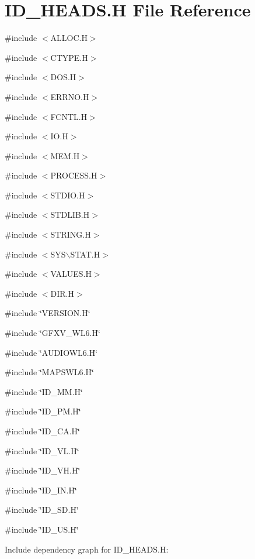 \hypertarget{ID__HEADS_8H}{
\section{ID\_\-HEADS.H File Reference}
\label{ID__HEADS_8H}
}
{\ttfamily \#include $<$ALLOC.H$>$}\par
{\ttfamily \#include $<$CTYPE.H$>$}\par
{\ttfamily \#include $<$DOS.H$>$}\par
{\ttfamily \#include $<$ERRNO.H$>$}\par
{\ttfamily \#include $<$FCNTL.H$>$}\par
{\ttfamily \#include $<$IO.H$>$}\par
{\ttfamily \#include $<$MEM.H$>$}\par
{\ttfamily \#include $<$PROCESS.H$>$}\par
{\ttfamily \#include $<$STDIO.H$>$}\par
{\ttfamily \#include $<$STDLIB.H$>$}\par
{\ttfamily \#include $<$STRING.H$>$}\par
{\ttfamily \#include $<$SYS$\backslash$STAT.H$>$}\par
{\ttfamily \#include $<$VALUES.H$>$}\par
{\ttfamily \#include $<$DIR.H$>$}\par
{\ttfamily \#include \char`\"{}VERSION.H\char`\"{}}\par
{\ttfamily \#include \char`\"{}GFXV\_\-WL6.H\char`\"{}}\par
{\ttfamily \#include \char`\"{}AUDIOWL6.H\char`\"{}}\par
{\ttfamily \#include \char`\"{}MAPSWL6.H\char`\"{}}\par
{\ttfamily \#include \char`\"{}ID\_\-MM.H\char`\"{}}\par
{\ttfamily \#include \char`\"{}ID\_\-PM.H\char`\"{}}\par
{\ttfamily \#include \char`\"{}ID\_\-CA.H\char`\"{}}\par
{\ttfamily \#include \char`\"{}ID\_\-VL.H\char`\"{}}\par
{\ttfamily \#include \char`\"{}ID\_\-VH.H\char`\"{}}\par
{\ttfamily \#include \char`\"{}ID\_\-IN.H\char`\"{}}\par
{\ttfamily \#include \char`\"{}ID\_\-SD.H\char`\"{}}\par
{\ttfamily \#include \char`\"{}ID\_\-US.H\char`\"{}}\par
Include dependency graph for ID\_\-HEADS.H:
